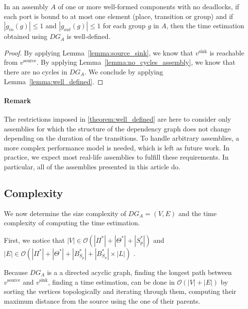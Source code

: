 \begin{theorem}
 In an assembly $A$ of one or more well-formed components with no deadlocks,
 if each port is bound to at most one element (place, transition or group) and if
 $\left|g_{in}(g)\right|\leq 1$ and $\left|g_{out}(g)\right|\leq 1$ for each group
 $g$ in $A$, then the time estimation obtained using $DG_A$ is well-defined.
 \label{theorem:well_defined}
\end{theorem}

\begin{proof}
 By applying Lemma~\ref{lemma:source_sink}, we know that $v^\text{sink}$ is reachable
 from $v^\text{source}$. By applying Lemma~\ref{lemma:no_cycles_assembly}, we know
 that there are no cycles in $DG_A$. We conclude by applying
 Lemma~\ref{lemma:well_defined}.
\end{proof}

\paragraph{Remark}

The restrictions imposed in \ref{theorem:well_defined} are here to consider only
assemblies for which the structure of the dependency graph does not change
depending on the duration of the transitions. To handle arbitrary assemblies,
a more complex performance model is needed, which is left as future work. In
practice, we expect most real-life assemblies to fulfill these requirements.
In particular, all of the assemblies presented in this article do.


\subsection{Complexity}

We now determine the size complexity of $DG_A=(V,E)$ and the time
complexity of computing the time estimation.

First, we notice that
$|V| \in \mathcal{O}\left(\left|\Pi^*\right|+\left|\Theta^*\right|+\left|S_p^*\right|\right)$
and
$|E| \in \mathcal{O}\left(\left|\Pi^*\right|+\left|\Theta^*\right|+\left|B_{S_p}^*\right|+\left|B_{S_u}^*\right|\times\left|L\right|\right)$
.

Because $DG_A$ is a a directed acyclic graph, finding the longest path
between $v^\text{source}$ and $v^\text{sink}$, \ie finding a time estimation,
can be done in $\mathcal{O}(|V|+|E|)$ by sorting the
vertices topologically and iterating through them, computing their maximum
distance from the source using the one of their parents.


